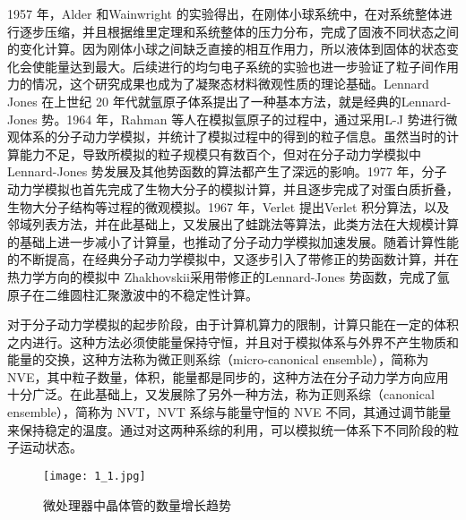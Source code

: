 1957 年，Alder 和Wainwright\cite{alder1957phase} 的实验得出，在刚体小球系统中，在对系统整体进行逐步压缩，并且根据维里定理和系统整体的压力分布，完成了固液不同状态之间的变化计算。因为刚体小球之间缺乏直接的相互作用力，所以液体到固体的状态变化会使能量达到最大。后续进行的均匀电子系统的实验也进一步验证了粒子间作用力的情况，这个研究成果也成为了凝聚态材料微观性质的理论基础。Lennard Jones 在上世纪 20 年代就氩原子体系提出了一种基本方法，就是经典的Lennard-Jones 势\cite{jones1924determination}。1964 年，Rahman 等人在模拟氩原子的过程中\cite{rahman1964correlations}，通过采用L-J 势进行微观体系的分子动力学模拟，并统计了模拟过程中的得到的粒子信息。虽然当时的计算能力不足，导致所模拟的粒子规模只有数百个，但对在分子动力学模拟中 Lennard-Jones 势发展及其他势函数的算法都产生了深远的影响。1977 年，分子动力学模拟也首先完成了生物大分子的模拟计算\cite{mccammon1977dynamics}，并且逐步完成了对蛋白质折叠，生物大分子结构等过程的微观模拟。1967 年，Verlet 提出Verlet 积分算法\cite{verlet1967computer}，以及邻域列表方法，并在此基础上，又发展出了蛙跳法等算法，此类方法在大规模计算的基础上进一步减小了计算量，也推动了分子动力学模拟加速发展。随着计算性能的不断提高，在经典分子动力学模拟中，又逐步引入了带修正的势函数计算，并在热力学方向的模拟中 Zhakhovskii\cite{zhakhovskii2009molecular}采用带修正的Lennard-Jones 势函数，完成了氩原子在二维圆柱汇聚激波中的不稳定性计算。

对于分子动力学模拟的起步阶段，由于计算机算力的限制，计算只能在一定的体积之内进行。这种方法必须使能量保持守恒，并且对于模拟体系与外界不产生物质和能量的交换，这种方法称为微正则系综（micro-canonical ensemble），简称为NVE，其中粒子数量，体积，能量都是同步的，这种方法在分子动力学方向应用十分广泛。在此基础上，又发展除了另外一种方法，称为正则系综（canonical ensemble），简称为 NVT，NVT 系综与能量守恒的 NVE 不同，其通过调节能量来保持稳定的温度。通过对这两种系综的利用，可以模拟统一体系下不同阶段的粒子运动状态。

 \begin{figure}[h]
  \centering
  \texttt{[image: 1\_1.jpg]}
  \caption{微处理器中晶体管的数量增长趋势}
\end{figure}

